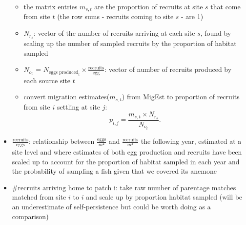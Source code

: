 \documentclass[12pt, oneside]{article}   	%
\begin{document}
\begin{itemize}
\begin{itemize}
			\item the matrix entries $m_{s,t}$ are the proportion of recruits at site $s$ that come from site $t$ (the row sums - recruits coming to site $s$ - are 1)
			\item $N_{r_s}$: vector of the number of recruits arriving at each site $s$, found by scaling up the number of sampled recruits by the proportion of habitat sampled
			\item $N_{o_t}$ = $N_{\text{eggs produced}_t} \times \frac{\text{recruits}}{\text{egg}}$: vector of number of recruits produced by each source site $t$
			\item convert migration estimates($m_{s,t}$) from MigEst to proportion of recruits from site $i$ settling at site $j$:
			\begin{equation}
			p_{i,j} = \frac{m_{s,t} \times N_{r_s}}{N_{o_t}}. \label{PijfromMigEst}
			\end{equation}
		\end{itemize}
	\item $\frac{\text{recruits}}{\text{eggs}}$: relationship between $\frac{\text{eggs}}{m^2}$ and $\frac{\text{recruits}}{m^2}$ the following year, estimated at a site level and where estimates of both egg production and recruits have been scaled up to account for the proportion of habitat sampled in each year and the probability of sampling a fish given that we covered its anemone
	\item $\# \text{recruits arriving home to patch i}$: take raw number of parentage matches matched from site $i$ to $i$ and scale up by proportion habitat sampled (will be an underestimate of self-persistence but could be worth doing as a comparison)
	

\end{itemize}
\end{document}
